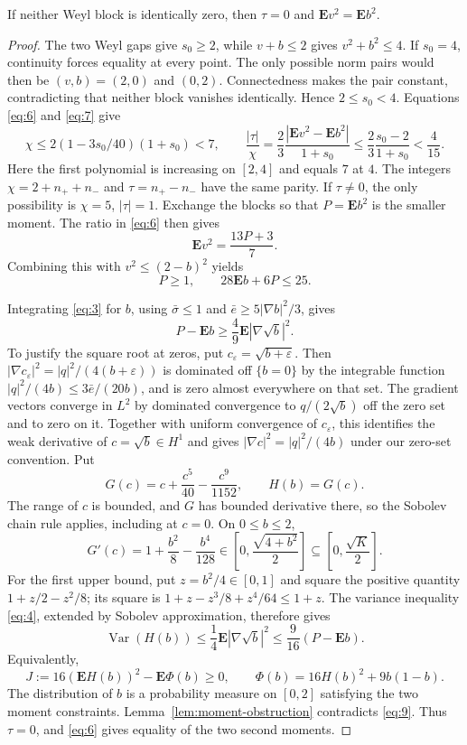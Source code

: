 \begin{proposition}\label{prop:balanced-moments}
If neither Weyl block is identically zero, then
$\tau=0$ and $\mathbf E v^2=\mathbf E b^2$.
\end{proposition}
\begin{proof}
The two Weyl gaps give $s_0\ge2$, while $v+b\le2$ gives
$v^2+b^2\le4$. If $s_0=4$, continuity forces equality at every point.
The only possible norm pairs would then be $(v,b)=(2,0)$ and $(0,2)$.
Connectedness makes the pair constant, contradicting that neither block
vanishes identically. Hence $2\le s_0<4$.  Equations \eqref{eq:6} and \eqref{eq:7} give
\[
 \chi\le2(1-3s_0/40)(1+s_0)<7,
 \qquad
 \frac{|\tau|}{\chi}
 =\frac23\frac{|\mathbf E v^2-\mathbf E b^2|}{1+s_0}
 \le\frac23\frac{s_0-2}{1+s_0}<\frac4{15}.
\]
Here the first polynomial is increasing on $[2,4]$ and equals $7$ at
$4$.  The integers $\chi=2+n_++n_-$ and $\tau=n_+-n_-$ have the same
parity.  If $\tau\ne0$, the only possibility is $\chi=5$, $|\tau|=1$.
Exchange the blocks so that $P=\mathbf E b^2$ is the smaller moment.
The ratio in \eqref{eq:6} then gives
\[
 \mathbf E v^2=\frac{13P+3}{7}.
\]
Combining this with $v^2\le(2-b)^2$ yields
\[
 P\ge1,\qquad28\mathbf E b+6P\le25.
\]

Integrating \eqref{eq:3} for $b$, using $\bar\sigma\le1$ and
$\bar e\ge5|\nabla b|^2/3$, gives
\[
 P-\mathbf E b\ge\frac49\mathbf E|\nabla\sqrt b|^2.
\]
To justify the square root at zeros, put $c_\varepsilon=\sqrt{b+\varepsilon}$.
Then
$|\nabla c_\varepsilon|^2=|q|^2/(4(b+\varepsilon))$
is dominated off $\{b=0\}$ by the integrable function
$|q|^2/(4b)\le3\bar e/(20b)$, and is zero almost everywhere
on that set. The gradient vectors converge in $L^2$ by dominated
convergence to $q/(2\sqrt b)$ off the zero set and to zero on it.
Together with uniform convergence of $c_\varepsilon$, this identifies
the weak derivative of $c=\sqrt b\in H^1$ and gives
$|\nabla c|^2=|q|^2/(4b)$ under our zero-set convention. Put
\[
 G(c)=c+\frac{c^5}{40}-\frac{c^9}{1152},\qquad H(b)=G(c).
\]
The range of $c$ is bounded, and $G$ has bounded derivative there, so the
Sobolev chain rule applies, including at $c=0$. On $0\le b\le2$,
\[
 G'(c)=1+\frac{b^2}{8}-\frac{b^4}{128}
 \in\left[0,\frac{\sqrt{4+b^2}}2\right]
 \subseteq\left[0,\frac{\sqrt K}2\right].
\]
For the first upper bound, put $z=b^2/4\in[0,1]$ and square the positive
quantity $1+z/2-z^2/8$; its square is
$1+z-z^3/8+z^4/64\le1+z$.
The variance inequality \eqref{eq:4}, extended by Sobolev approximation,
therefore gives
\[
 \operatorname{Var}(H(b))
 \le\frac14\mathbf E|\nabla\sqrt b|^2
 \le\frac9{16}(P-\mathbf E b).
\]
Equivalently,
\[
 J:=16(\mathbf E H(b))^2-\mathbf E\Phi(b)\ge0,
 \qquad \Phi(b)=16H(b)^2+9b(1-b).
 \tag{9}\label{eq:9}
\]
The distribution of $b$ is a probability measure on $[0,2]$ satisfying
the two moment constraints.  Lemma~\ref{lem:moment-obstruction}
contradicts \eqref{eq:9}.  Thus $\tau=0$, and \eqref{eq:6} gives equality
of the two second moments.
\end{proof}

